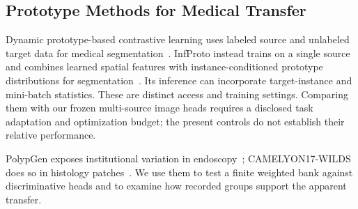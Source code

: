 \subsection{Prototype Methods for Medical Transfer}
Dynamic prototype-based contrastive learning uses labeled source and unlabeled target data for medical segmentation~\cite{en2024dpcl}. InfProto instead trains on a single source and combines learned spatial features with instance-conditioned prototype distributions for segmentation~\cite{guo2024infproto}. Its inference can incorporate target-instance and mini-batch statistics. These are distinct access and training settings. Comparing them with our frozen multi-source image heads requires a disclosed task adaptation and optimization budget; the present controls do not establish their relative performance.

PolypGen exposes institutional variation in endoscopy~\cite{ali2023polypgen}; CAMELYON17-WILDS does so in histology patches~\cite{bandi2019camelyon,koh2021wilds}. We use them to test a finite weighted bank against discriminative heads and to examine how recorded groups support the apparent transfer.


